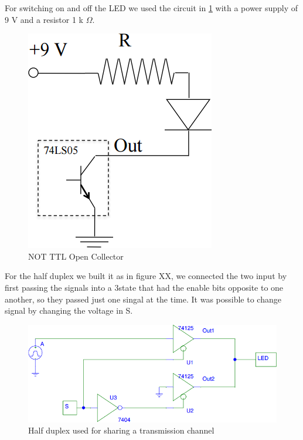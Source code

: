 For switching on and off the LED we used the circuit in \ref{LED_ON_OFF} with a power supply of 9 V and a resistor 1  k $\Omega$.
\begin{figure}[H]
\centering
\includegraphics[width=.7\textwidth]{10/LED_ON_OFF.png}
\caption{NOT TTL Open Collector}\label{LED_ON_OFF}
\end{figure}
For the half duplex we built it as in figure XX, we connected the two input by first passing the signals into a  3state that had the enable bits opposite to one another, so they passed just one singal at the time. It was possible to change signal by changing the voltage in S.
\begin{figure}[H]
\centering
\includegraphics[width=.7\textwidth]{10/TTL_3state.png}
\caption{Half duplex used for sharing a transmission channel}\label{TTL_3state}
\end{figure}

